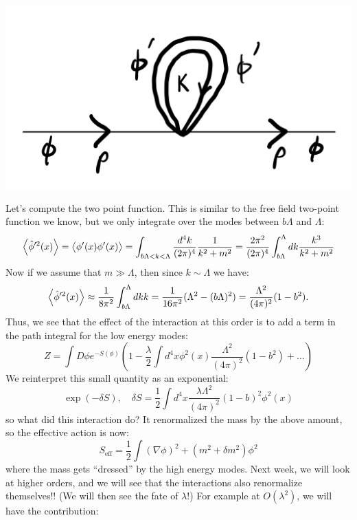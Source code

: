 \begin{center}
    \includegraphics[scale=0.35]{Lectures/Figures/lec14-massrenorm.png}
\end{center}

Let's compute the two point function. This is similar to the free field two-point function we know, but we only integrate over the modes between $b\Lambda$ and $\Lambda$:
\begin{equation}
    \left< \hat{\phi}'^2(x) \right> = \left< \phi'(x)\phi'(x) \right> = \int_{b\Lambda < k < \Lambda}\frac{d^4k}{(2\pi)^4}\frac{1}{k^2 + m^2} = \frac{2\pi^2}{(2\pi)^4}\int_{b\Lambda}^\Lambda dk \frac{k^3}{k^2 + m^2}
\end{equation}
Now if we assume that $m \gg \Lambda$, then since $k \sim \Lambda$ we have:
\begin{equation}
    \left< \hat{\phi}'^2(x) \right> \approx \frac{1}{8\pi^2}\int_{b\Lambda}^\Lambda dkk = \frac{1}{16\pi^2}(\Lambda^2 - (b\Lambda)^2) = \frac{\Lambda^2}{(4\pi)^2}(1 - b^2).
\end{equation}
Thus, we see that the effect of the interaction at this order is to add a term in the path integral for the low energy modes:
\begin{equation}
    Z = \int D\phi e^{-S(\phi)}\left(1 - \frac{\lambda}{2}\int d^4x \phi^2(x)\frac{\Lambda^2}{(4\pi)^2}(1 - b^2) + \ldots \right)
\end{equation}
We reinterpret this small quantity as an exponential:
\begin{equation}
    \exp(-\delta S), \quad \delta S = \frac{1}{2}\int d^4x \frac{\lambda \Lambda^2}{(4\pi)^2}(1 - b)^2\phi^2(x)
\end{equation}
so what did this interaction do? It renormalized the mass by the above amount, so the effective action is now:
\begin{equation}
    S_{\text{eff}} = \frac{1}{2}\int (\nabla \phi)^2 + (m^2 + \delta m^2)\phi^2
\end{equation}
where the mass gets ``dressed'' by the high energy modes. Next week, we will look at higher orders, and we will see that the interactions also renormalize themselves!! (We will then see the fate of $\lambda$!) For example at $O(\lambda^2) $, we will have the contribution:

